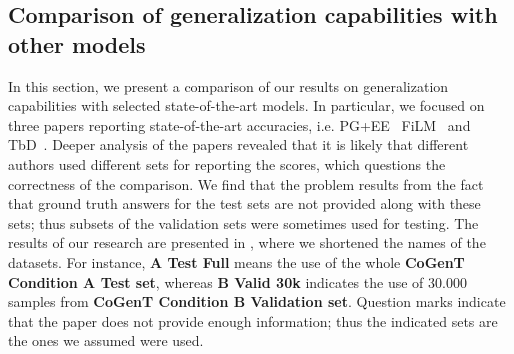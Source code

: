 \subsection{Comparison of generalization capabilities with other models}
\label{sec:comparison}

In this section, we present a comparison of our results on generalization capabilities with selected state-of-the-art models.
In particular, we focused on three papers reporting state-of-the-art accuracies, i.e. PG+EE~\cite{johnson2017inferring} FiLM~\cite{perez2017film} and TbD~\cite{mascharka2018transparency}.
Deeper analysis of the papers revealed that it is likely that different authors used different sets for reporting the scores, which questions the correctness of the comparison.
We find that the problem results from the fact that ground truth answers for the test sets are not provided along with these sets; thus subsets of the validation sets were sometimes used for testing. 
The results of our research are presented in , where we shortened the names of the datasets.
For instance, \textbf{A Test Full} means the use of the whole \textbf{CoGenT Condition A Test set}, whereas \textbf{B Valid 30k} indicates the use of 30.000 samples from \textbf{CoGenT Condition B Validation set}.
Question marks indicate that the paper does not provide enough information; thus the indicated sets are the ones we assumed were used.


